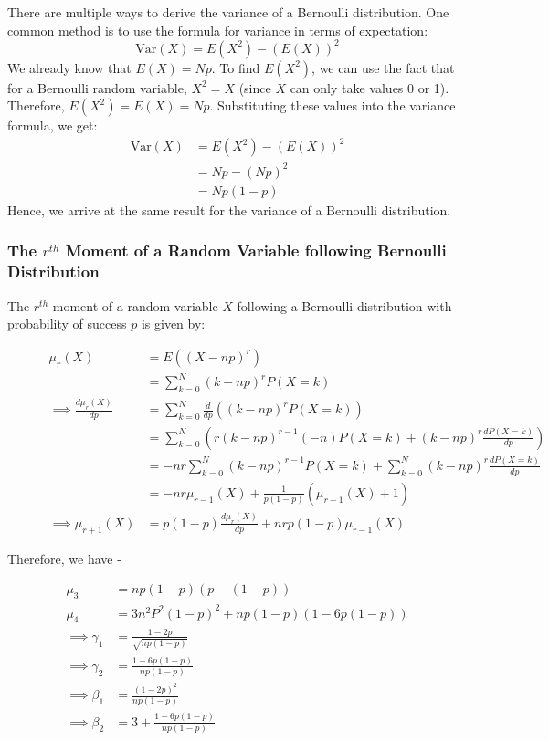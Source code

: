 \documentclass[openany]{book}
\begin{document}
\begin{mynote}
    There are multiple ways to derive the variance of a Bernoulli distribution. One common method is to use the formula for variance in terms of expectation:
    $$\text{Var}(X) = E(X^2) - (E(X))^2$$
    We already know that $E(X) = Np$. To find $E(X^2)$, we can use the fact that for a Bernoulli random variable, $X^2 = X$ (since $X$ can only take values 0 or 1). Therefore, $E(X^2) = E(X) = Np$. Substituting these values into the variance formula, we get:
    \begin{align*}
        \text{Var}(X) &= E(X^2) - (E(X))^2 \\
        &= Np - (Np)^2 \\
        &= Np(1 - p)
    \end{align*}
    Hence, we arrive at the same result for the variance of a Bernoulli distribution.
\end{mynote}
\subsubsection{The $r^{th}$ Moment of a Random Variable following Bernoulli Distribution}
The $r^{th}$ moment of a random variable $X$ following a Bernoulli distribution with probability of success $p$ is given by:
\begin{figure}[H]
\begin{align*}
    \mu_r(X) &= E((X - np)^r) \\
    &= \sum_{k=0}^{N} (k - np)^r P(X = k) \\
    \implies \frac{d\mu_r(X)}{dp} &= \sum_{k=0}^{N} \frac{d}{dp} \left((k - np)^r P(X = k)\right) \\
    &= \sum_{k=0}^{N} \left(r(k - np)^{r-1}(-n) P(X = k) + (k - np)^r \frac{dP(X = k)}{dp}\right) \\
    &= -nr \sum_{k=0}^{N} (k - np)^{r-1} P(X = k) + \sum_{k=0}^{N} (k - np)^r \frac{dP(X = k)}{dp} \\
    &= -nr \mu_{r-1}(X) + \frac{1}{p(1-p)}(\mu_{r+1}(X) + 1) \\
    \implies \mu_{r+1}(X) &= p(1-p)\frac{d\mu_r(X)}{dp} + nrp(1-p)\mu_{r-1}(X)
\end{align*}
\end{figure}
Therefore, we have - 
\begin{figure}[H]
\begin{align*}
    \mu_3 &= np(1-p)(p-(1-p)) \\
    \mu_4 &= 3n^2P^2(1-p)^2 + np(1-p)(1-6p(1-p)) \\
    \implies \gamma_1 &= \frac{1-2p}{\sqrt{np(1-p)}} \\
    \implies \gamma_2 &= \frac{1-6p(1-p)}{np(1-p)} \\
    \implies \beta_1 &= \frac{(1-2p)^2}{np(1-p)} \\
    \implies \beta_2 &= 3 + \frac{1-6p(1-p)}{np(1-p)} \\ 
\end{align*}
\end{figure}
\end{document}
